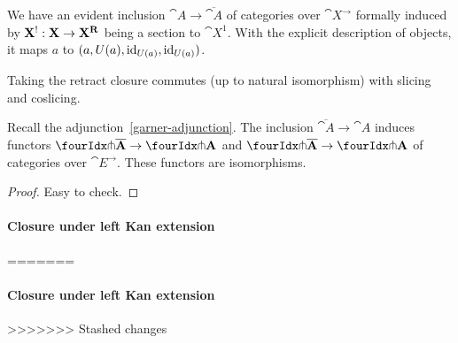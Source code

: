 \documentclass[reqno,10pt,a4paper,oneside]{amsart}
\begin{document}
We have an evident inclusion $\cat{A} \to \overline{\cat{A}}$ of categories over $\cat{X}^{\to}$ formally induced by $\mathbf{X}^{\mathord{!}} : \mathbf{X} \to \mathbf{X}^{\mathbf{R}}$ being a section to $\cat{X}^1$.
With the explicit description of objects, it maps $a$ to $(a, U(a), \operatorname{id}_{U(a)}, \operatorname{id}_{U(a)})$.

\begin{remark}
\label{retract-closure-slicing}
Taking the retract closure commutes (up to natural isomorphism) with slicing and coslicing.
\end{remark}

\begin{lemma}
\label{retract-closure}
Recall the adjunction~\eqref{garner-adjunction}.
The inclusion $\overline{\cat{A}} \to \cat{A}$ induces functors $\liftl{\overline{\cat{A}}} \to \liftl{\cat{A}}$ and $\liftr{\overline{\cat{A}}} \to \liftr{\cat{A}}$ of categories over $\cat{E}^{\to}$.
These functors are isomorphisms.
\end{lemma}

\begin{proof}
Easy to check.
\end{proof}

\paragraph{Closure under left Kan extension}
=======
\paragraph{Closure under left Kan extension} 



>>>>>>> Stashed changes
\end{document}
